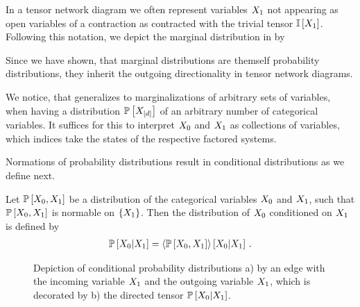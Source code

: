 In a tensor network diagram we often represent variables $X_{1}$ not appearing as open variables of a contraction as contracted with the trivial tensor $\mathbb{I}\left[X_{1}\right]$.
Following this notation, we depict the marginal distribution in  by
\begin{center}
    
\end{center}
Since we have shown, that marginal distributions are themself probability distributions, they inherit the outgoing directionality in tensor network diagrams.

We notice, that  generalizes to marginalizations of arbitrary sets of variables, when having a distribution $\mathbb{P}\left[X_{[d]}\right]$ of an arbitrary number of categorical variables.
It suffices for this to interpret $X_{0}$ and $X_{1}$ as collections of variables, which indices take the states of the respective factored systems.


Normations of probability distributions result in conditional distributions as we define next.

\begin{definition}
    \label{def:conditionalProbability}
    Let $\mathbb{P}\left[X_{0},X_{1}\right]$ be a distribution of the categorical variables $X_{0}$ and $X_{1}$, such that $\mathbb{P}\left[X_{0},X_{1}\right]$ is normable on $\{X_{1}\}$.
    Then the distribution of $X_{0}$ conditioned on $X_{1}$ is defined by
    \begin{align*}
        \mathbb{P}\left[X_{0}|X_{1}\right]
        = \left\langle \mathbb{P}\left[X_{0},X_{1}\right]\right\rangle \left[ X_{0} | X_{1} \right] \, .
    \end{align*}
\end{definition}

\begin{figure}[hbt!]
    \begin{center}
        
    \end{center}
    \caption{Depiction of conditional probability distributions a) by an edge with the incoming variable $X_{1}$ and the outgoing variable $X_{1}$, which is decorated by b) the directed tensor $\mathbb{P}\left[X_{0}|X_{1}\right]$. }
    \label{fig:conditionalDistribution}
\end{figure}

